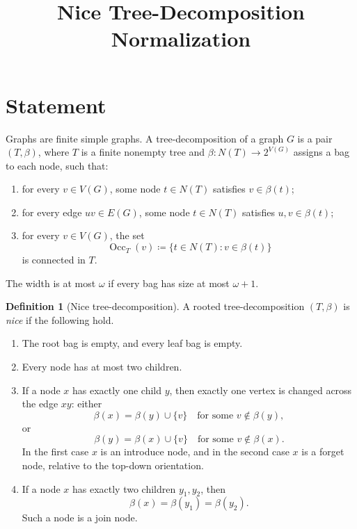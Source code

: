 \documentclass[11pt]{article}
\title{Nice Tree-Decomposition Normalization}
\author{}
\date{}
\theoremstyle{definition}
\newtheorem{definition}{Definition}[section]
\newcommand{\defeq}{\coloneqq}
\newcommand{\Nodes}{N}
\newcommand{\Occ}{\operatorname{Occ}}
\begin{document}
\maketitle

\section{Statement}

Graphs are finite simple graphs.  A tree-decomposition of a graph \(G\) is a
pair \((T,\beta)\), where \(T\) is a finite nonempty tree and
\(\beta:\Nodes(T)\to 2^{V(G)}\) assigns a bag to each node, such that:
\begin{enumerate}[label=\textup{(TD\arabic*)},leftmargin=*]
  \item for every \(v\in V(G)\), some node \(t\in\Nodes(T)\) satisfies
    \(v\in\beta(t)\);
  \item for every edge \(uv\in E(G)\), some node \(t\in\Nodes(T)\) satisfies
    \(u,v\in\beta(t)\);
  \item for every \(v\in V(G)\), the set
    \[
      \Occ_T(v)\defeq\{t\in\Nodes(T):v\in\beta(t)\}
    \]
    is connected in \(T\).
\end{enumerate}
The width is at most \(\omega\) if every bag has size at most \(\omega+1\).

\begin{definition}[Nice tree-decomposition]
A rooted tree-decomposition \((T,\beta)\) is \emph{nice} if the following hold.
\begin{enumerate}[label=\textup{(N\arabic*)},leftmargin=*]
  \item The root bag is empty, and every leaf bag is empty.
  \item Every node has at most two children.
  \item If a node \(x\) has exactly one child \(y\), then exactly one vertex is
    changed across the edge \(xy\): either
    \[
      \beta(x)=\beta(y)\cup\{v\}\quad\text{for some }v\notin\beta(y),
    \]
    or
    \[
      \beta(y)=\beta(x)\cup\{v\}\quad\text{for some }v\notin\beta(x).
    \]
    In the first case \(x\) is an introduce node, and in the second case
    \(x\) is a forget node, relative to the top-down orientation.
  \item If a node \(x\) has exactly two children \(y_1,y_2\), then
    \[
      \beta(x)=\beta(y_1)=\beta(y_2).
    \]
    Such a node is a join node.
\end{enumerate}
\end{definition}
\end{document}
